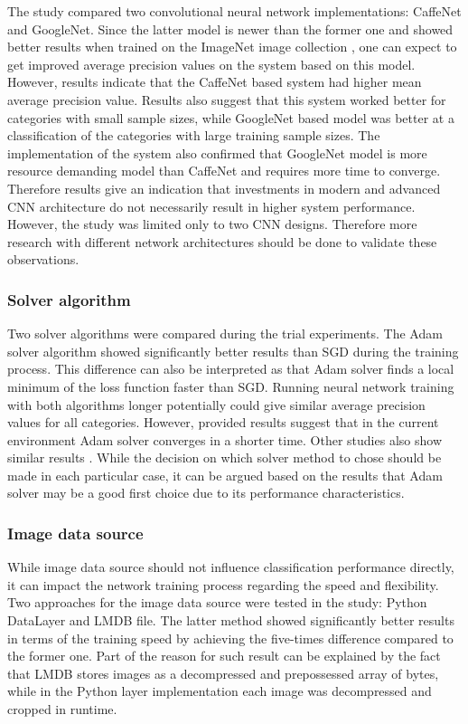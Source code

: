 The study compared two convolutional neural network implementations: CaffeNet and GoogleNet. Since the latter model is newer than the former one and showed better results when trained on the ImageNet image collection \cite{Szegedy2015GoingDeeper}, one can expect to get improved average precision values on the system based on this model. However, results indicate that the CaffeNet based system had higher mean average precision value. Results also suggest that this system worked better for categories with small sample sizes, while GoogleNet based model was better at a classification of the categories with large training sample sizes. The implementation of the system also confirmed that GoogleNet model is more resource demanding model than CaffeNet and requires more time to converge. Therefore results give an indication that investments in modern and advanced CNN architecture do not necessarily result in higher system performance. However, the study was limited only to two CNN designs. Therefore more research with different network architectures should be done to validate these observations.


\subsubsection{Solver algorithm}
Two solver algorithms were compared during the trial experiments. The Adam solver algorithm showed significantly better results than SGD during the training process. This difference can also be interpreted as that Adam solver finds a local minimum of the loss function faster than SGD. Running neural network training with both algorithms longer potentially could give similar average precision values for all categories. However, provided results suggest that in the current environment Adam solver converges in a shorter time. Other studies also show similar results \cite{adam}. While the decision on which solver method to chose should be made in each particular case, it can be argued based on the results that Adam solver may be a good first choice due to its performance characteristics.

\subsubsection{Image data source}
While image data source should not influence classification performance directly, it can impact the network training process regarding the speed and flexibility. Two approaches for the image data source were tested in the study: Python DataLayer and LMDB file. The latter method showed significantly better results in terms of the training speed by achieving the five-times difference compared to the former one. Part of the reason for such result can be explained by the fact that LMDB stores images as a decompressed and prepossessed array of bytes, while in the Python layer implementation each image was decompressed and cropped in runtime.

